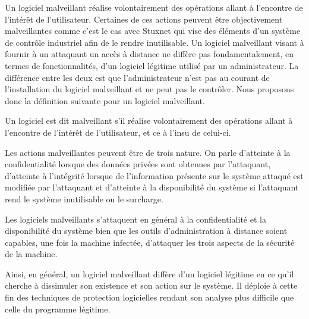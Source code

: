 
Un logiciel malveillant réalise volontairement des opérations allant à l'encontre de l'intérêt de l'utilisateur. 
Certaines de ces actions peuvent être objectivement malveillantes comme c'est le cas avec Stuxnet qui vise des éléments d'un système de contrôle industriel afin de le rendre inutilisable. 
Un logiciel malveillant visant à fournir à un attaquant un accès à distance ne diffère pas fondamentalement, en termes de fonctionnalités, d'un logiciel légitime utilisé par un administrateur.
La différence entre les deux est que l'administrateur n'est pas au courant de l'installation du logiciel malveillant et ne peut pas le contrôler.
Nous proposons donc la définition suivante pour un logiciel malveillant.
\begin{defi}
Un logiciel est dit malveillant s'il réalise volontairement des opérations allant à l'encontre de l'intérêt de l'utilisateur, et ce à l'insu de celui-ci.
\end{defi}

Les actions malveillantes peuvent être de trois nature. On parle d'atteinte à la confidentialité lorsque des données privées sont obtenues par l'attaquant, d'atteinte à l'intégrité lorsque de l'information présente sur le système attaqué est modifiée par l'attaquant et d'atteinte à la disponibilité du système si l'attaquant rend le système inutilisable ou le surcharge.

Les logiciels malveillants s'attaquent en général à la confidentialité et la disponibilité du système bien que les outils d'administration à distance soient capables, une fois la machine infectée, d'attaquer les trois aspects de la sécurité de la machine.

Ainsi, en général, un logiciel malveillant diffère d'un logiciel légitime en ce qu'il cherche à dissimuler son existence et son action sur le système. Il déploie à cette fin des techniques de protection logicielles rendant son analyse plus difficile que celle du programme légitime.


